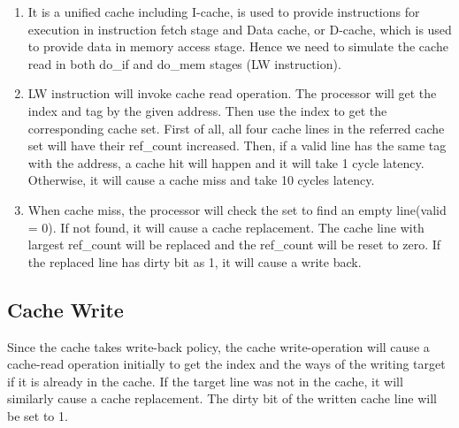 \documentclass[paper=a4, fontsize=11pt]{scrartcl} %
\numberwithin{equation}{section} %
\numberwithin{figure}{section} %
\numberwithin{table}{section} %
\begin{document}
\begin{enumerate}
\item It is a unified cache including I-cache, is used to provide instructions for execution in instruction fetch stage and Data cache, or D-cache, which is used to provide data in memory access stage. Hence we need to simulate the cache read in both do\_if and do\_mem stages (LW instruction).
\item LW instruction will invoke cache read operation. The processor will get the index and tag by the given address. Then use the index to get the corresponding cache set. First of all, all four cache lines in the referred cache set will have their ref\_count increased. Then, if a valid line has the same tag with the address, a cache hit will happen and it will take 1 cycle latency. Otherwise, it will cause a cache miss and take 10 cycles latency.
\item When cache miss, the processor will check the set to find an empty line(valid = 0). If not found, it will cause a cache replacement. The cache line with largest ref\_count will be replaced and the ref\_count will be reset to zero. If the replaced line has dirty bit as 1, it will cause a write back.
\end{enumerate}

\subsection{Cache Write}
Since the cache takes write-back policy, the cache write-operation will cause a cache-read operation initially to get the index and the ways of the writing target if it is already in the cache. If the target line was not in the cache, it will similarly cause a cache replacement. The dirty bit of the written cache line will be set to 1.
\end{document}
